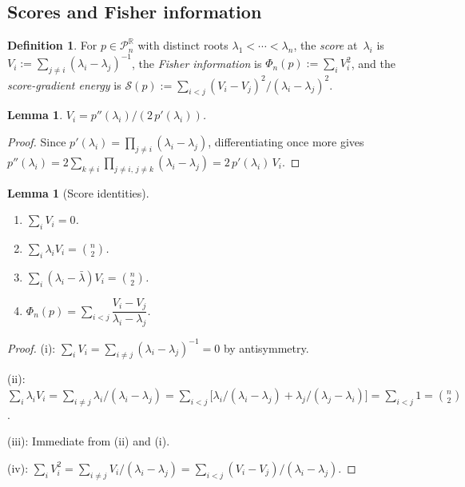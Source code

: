 \documentclass[11pt,a4paper]{amsart}
\theoremstyle{plain}
\newtheorem{lemma}[theorem]{Lemma}
\theoremstyle{definition}
\newtheorem{definition}[theorem]{Definition}
\theoremstyle{remark}
\newcommand{\R}{\mathbb{R}}
\newcommand{\PnR}[1][n]{\mathcal{P}^{\R}_{#1}}
\begin{document}
\subsection{Scores and Fisher information}

\begin{definition}\label{def:scores}
For $p\in\PnR$ with distinct roots
$\lambda_1<\cdots<\lambda_n$, the \emph{score} at~$\lambda_i$
is $V_i:=\sum_{j\ne i}(\lambda_i-\lambda_j)^{-1}$, the
\emph{Fisher information} is $\Phi_n(p):=\sum_i V_i^2$, and
the \emph{score-gradient energy} is
$\mathcal{S}(p):=\sum_{i<j}(V_i-V_j)^2/(\lambda_i-\lambda_j)^2$.
\end{definition}

\begin{lemma}\label{lem:score-Vi}
$V_i=p''(\lambda_i)/(2\,p'(\lambda_i))$.
\end{lemma}

\begin{proof}
Since $p'(\lambda_i)=\prod_{j\ne i}(\lambda_i-\lambda_j)$,
differentiating once more gives
$p''(\lambda_i)=2\sum_{k\ne i}\prod_{j\ne i,\,j\ne k}
(\lambda_i-\lambda_j)=2\,p'(\lambda_i)\,V_i$.
\end{proof}

\begin{lemma}[Score identities]\label{lem:score-ids}
\begin{enumerate}[label=\textup{(\roman*)},nosep]
\item $\sum_i V_i=0$.
\item $\sum_i\lambda_i V_i=\binom{n}{2}$.
\item $\sum_i(\lambda_i-\bar\lambda)V_i=\binom{n}{2}$.
\item $\Phi_n(p)
  =\sum_{i<j}\dfrac{V_i-V_j}{\lambda_i-\lambda_j}$.
\end{enumerate}
\end{lemma}

\begin{proof}
(i): $\sum_i V_i=\sum_{i\ne j}(\lambda_i-\lambda_j)^{-1}=0$
by antisymmetry.

(ii): $\sum_i\lambda_i V_i
=\sum_{i\ne j}\lambda_i/(\lambda_i-\lambda_j)
=\sum_{i<j}\bigl[\lambda_i/(\lambda_i-\lambda_j)
  +\lambda_j/(\lambda_j-\lambda_i)\bigr]
=\sum_{i<j}1=\binom{n}{2}$.

(iii): Immediate from (ii) and (i).

(iv): $\sum_i V_i^2
=\sum_{i\ne j}V_i/(\lambda_i-\lambda_j)
=\sum_{i<j}(V_i-V_j)/(\lambda_i-\lambda_j)$.
\end{proof}
\end{document}
